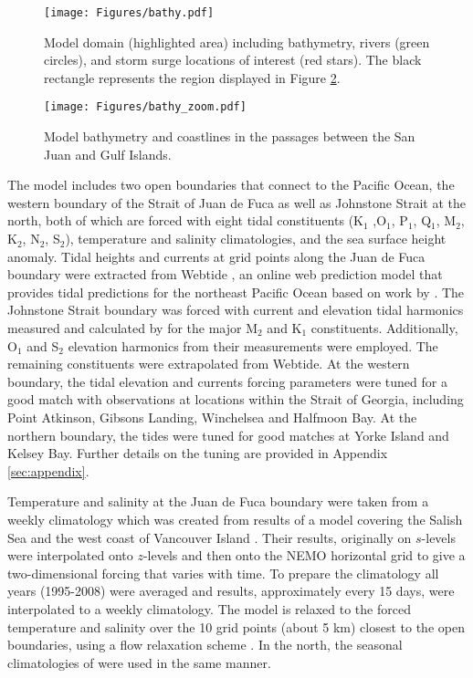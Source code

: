 \documentclass[letterpaper]{tATO2e}
\begin{document}
\begin{figure}[h]
\centering
\texttt{[image: Figures/bathy.pdf]}
\caption{{\color{red} Model domain (highlighted area) including bathymetry, rivers (green circles), and storm surge locations of interest  (red stars). The black rectangle represents the region displayed in Figure \ref{fig:zoom}.}}\label{fig:domain}
\end{figure}

\begin{figure}[h]
\centering
\texttt{[image: Figures/bathy\_zoom.pdf]}
\caption{{\color{red} Model bathymetry and coastlines in the passages between the San Juan and Gulf Islands.}}\label{fig:zoom}
\end{figure}

The model includes two open boundaries that connect to the Pacific Ocean, the western boundary of the Strait of Juan de Fuca as well as Johnstone Strait at the north, both of which are forced with eight tidal constituents (K$_1$ ,O$_1$, P$_1$, Q$_1$, M$_2$, K$_2$, N$_2$, S$_2$), temperature and salinity climatologies, and the sea surface height anomaly. Tidal heights and currents at grid points along the Juan de Fuca boundary were extracted from Webtide \citep{webtide}, an online web prediction model that provides tidal predictions for the northeast Pacific Ocean based on work by \citet{foreman2000webtide}. The Johnstone Strait boundary was forced with current and elevation tidal harmonics measured and calculated by \citet{thomson1980johnstone} for the major M$_2$ and K$_1$ constituents. Additionally, O$_1$ and S$_2$ elevation harmonics from their measurements were employed. The remaining constituents were extrapolated from Webtide. At the western boundary, the tidal elevation and currents forcing parameters were tuned for a good match with observations at locations within the Strait of Georgia, including Point Atkinson, Gibsons Landing, Winchelsea and Halfmoon Bay. At the northern boundary, the tides were tuned for good matches at Yorke Island and Kelsey Bay. Further details on the tuning are provided in Appendix \ref{sec:appendix}. 

Temperature and salinity at the Juan de Fuca boundary were taken from a weekly climatology which was created from results of a model covering the Salish Sea and the west coast of Vancouver Island \citep{massonfine2012}.  Their results, originally on $s$-levels were interpolated onto $z$-levels and then onto the NEMO horizontal grid to give a two-dimensional forcing that varies with time.  To prepare the climatology all years (1995-2008) were averaged and results, approximately every 15 days, were interpolated to a weekly climatology. The model is relaxed to the forced temperature and salinity over the 10 grid points (about 5 km) closest to the open boundaries, using a flow relaxation scheme \citep{engedahl1995use}. {\color{red} In the north, the seasonal climatologies of \citet{thomson1981oceanography} were used in the same manner.} %
\end{document}
